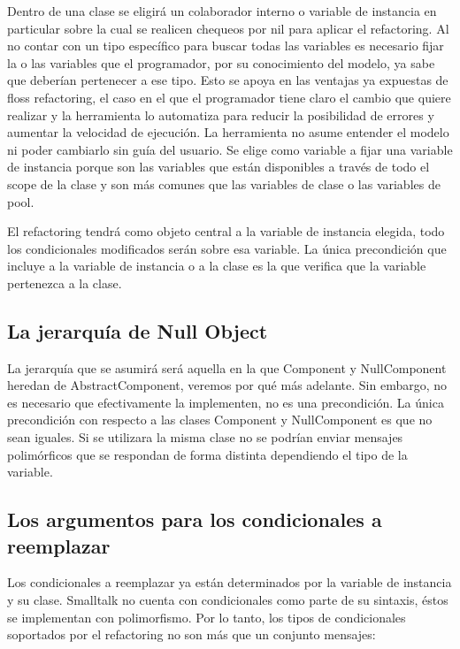 Dentro de una clase se eligirá un colaborador interno o variable de instancia en particular sobre la
cual se realicen chequeos por nil para aplicar el refactoring. Al no contar con un tipo específico
para buscar todas las variables es necesario fijar la o las variables que el programador, por su
conocimiento del modelo, ya sabe que deberían pertenecer a ese tipo. Esto se apoya en las ventajas
ya expuestas de floss refactoring, el caso en el que el programador tiene claro el cambio que quiere
realizar y la herramienta lo automatiza para reducir la posibilidad de errores y aumentar la
velocidad de ejecución. La herramienta no asume entender el modelo ni poder cambiarlo sin guía del
usuario. Se elige como variable a fijar una variable de instancia porque son las variables que están
disponibles a través de todo el scope de la clase y son más comunes que las variables de clase o
las variables de pool.

El refactoring tendrá como objeto central a la variable de instancia elegida, todo los condicionales
modificados serán sobre esa variable. La única precondición que incluye a la variable de
instancia o a la clase es la que verifica que la variable pertenezca a la clase.

\subsection*{La jerarquía de Null Object}

La jerarquía que se asumirá será aquella en la que Component y NullComponent heredan de
AbstractComponent, veremos por qué más adelante. Sin embargo, no es necesario que efectivamente la
implementen, no es una precondición. La única precondición con respecto a las clases Component y
NullComponent es que no sean iguales. Si se utilizara la misma clase no se podrían enviar mensajes
polimórficos que se respondan de forma distinta dependiendo el tipo de la variable.

\subsection*{Los argumentos para los condicionales a reemplazar}

Los condicionales a reemplazar ya están determinados por la variable de instancia y su clase. Smalltalk no
cuenta con condicionales como parte de su sintaxis, éstos se implementan con polimorfismo. Por lo tanto,
los tipos de condicionales soportados por el refactoring no son más que un conjunto mensajes:

